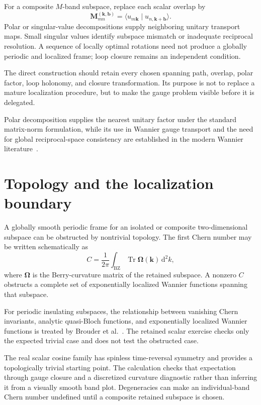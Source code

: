 For a composite $M$-band subspace, replace each scalar overlap by
\begin{equation}
    \mathbf M^{(\mathbf k,\mathbf b)}_{mn}
    =
    \langle
        u_{m\mathbf k}
        \mid
        u_{n,\mathbf k+\mathbf b}
    \rangle.
\end{equation}
Polar or singular-value decompositions supply neighboring unitary transport
maps. Small singular values identify subspace mismatch or inadequate reciprocal
resolution. A sequence of locally optimal rotations need not produce a globally
periodic and localized frame; loop closure remains an independent condition.

The direct construction should retain every chosen spanning path, overlap,
polar factor, loop holonomy, and closure transformation. Its purpose is not to
replace a mature localization procedure, but to make the gauge problem visible
before it is delegated.

Polar decomposition supplies the nearest unitary factor under the standard
matrix-norm formulation, while its use in Wannier gauge transport and the need
for global reciprocal-space consistency are established in the modern Wannier
literature~\cite{higham1986,marzari2012}.

\section{Topology and the localization boundary}


A globally smooth periodic frame for an isolated or composite two-dimensional
subspace can be obstructed by nontrivial topology. The first Chern number may
be written schematically as
\begin{equation}
    C
    =
    \frac{1}{2\pi}
    \int_{\mathrm{BZ}}
    \operatorname{Tr}\boldsymbol{\Omega}(\mathbf k)\,\mathrm{d}^2k,
\end{equation}
where $\boldsymbol{\Omega}$ is the Berry-curvature matrix of the retained subspace.
A nonzero $C$ obstructs a complete set of exponentially localized Wannier
functions spanning that subspace.

For periodic insulating subspaces, the relationship between vanishing Chern
invariants, analytic quasi-Bloch functions, and exponentially localized Wannier
functions is treated by Brouder et al.~\cite{brouder2007}. The retained scalar
exercise checks only the expected trivial case and does not test the obstructed
case.

The real scalar cosine family has spinless time-reversal symmetry and provides
a topologically trivial starting point. The calculation checks that expectation
through gauge closure and a discretized curvature diagnostic rather than
inferring it from a visually smooth band plot. Degeneracies can make an
individual-band Chern number undefined until a composite retained subspace is
chosen.

